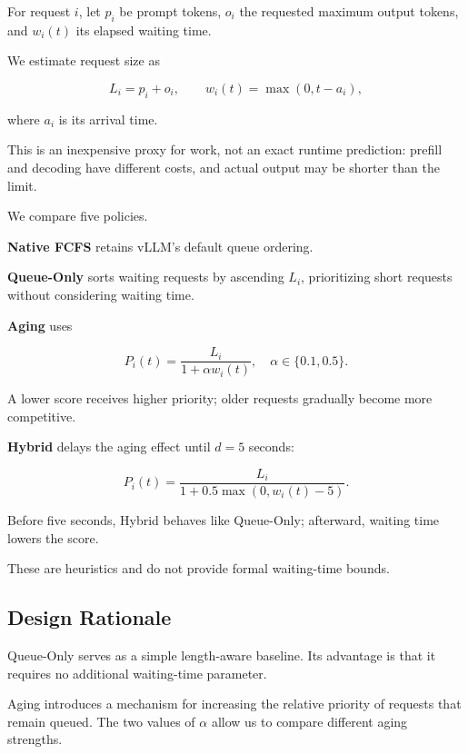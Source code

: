 \documentclass[sigplan,nonacm]{acmart}
\begin{document}
For request $i$, let $p_i$ be prompt tokens,
$o_i$ the requested maximum output tokens,
and $w_i(t)$ its elapsed waiting time.

We estimate request size as

\begin{equation}
L_i=p_i+o_i,\qquad
w_i(t)=\max(0,t-a_i),
\end{equation}

where $a_i$ is its arrival time.

This is an inexpensive proxy for work, not an exact
runtime prediction: prefill and decoding have
different costs, and actual output may be shorter
than the limit.

We compare five policies.

\textbf{Native FCFS}
retains vLLM's default queue ordering.

\textbf{Queue-Only}
sorts waiting requests by ascending $L_i$,
prioritizing short requests without considering
waiting time.

\textbf{Aging}
uses

\begin{equation}
P_i(t)=
\frac{L_i}{1+\alpha w_i(t)},
\quad
\alpha\in\{0.1,0.5\}.
\label{eq:aging}
\end{equation}

A lower score receives higher priority; older
requests gradually become more competitive.

\textbf{Hybrid}
delays the aging effect until $d=5$ seconds:

\begin{equation}
P_i(t)=
\frac{L_i}{
1+0.5\max(0,w_i(t)-5)
}.
\label{eq:hybrid}
\end{equation}

Before five seconds, Hybrid behaves like
Queue-Only; afterward, waiting time lowers
the score.

These are heuristics and do not provide
formal waiting-time bounds.

\subsection{Design Rationale}

Queue-Only serves as a simple length-aware baseline.
Its advantage is that it requires no additional
waiting-time parameter.

Aging introduces a mechanism for increasing the
relative priority of requests that remain queued.
The two values of $\alpha$ allow us to compare
different aging strengths.
\end{document}
